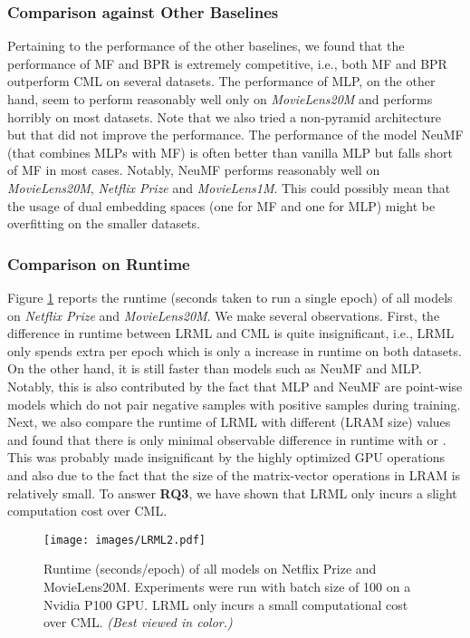 \documentclass[sigconf]{acmart}
\begin{document}
\subsubsection{Comparison against Other Baselines}
Pertaining to the performance of the other baselines, we found that the performance of MF and BPR is extremely competitive, i.e., both MF and BPR outperform CML on several datasets. The performance of MLP, on the other hand, seem to perform reasonably well only on \textit{MovieLens20M} and performs horribly on most datasets. Note that we also tried a non-pyramid architecture but that did not improve the performance.  The performance of the model NeuMF (that combines MLPs with MF) is often better than vanilla MLP but falls short of MF in most cases. Notably, NeuMF performs reasonably well on \textit{MovieLens20M}, \textit{Netflix Prize} and \textit{MovieLens1M}. This could possibly mean that the usage of dual embedding spaces (one for MF and one for MLP) might be overfitting on the smaller datasets. 

\subsubsection{Comparison on Runtime}
Figure \ref{fig:runtime} reports the runtime (seconds taken to run a single epoch) of all models on \textit{Netflix Prize} and \textit{MovieLens20M}. We make several observations. First, the difference in runtime between \textsc{LRML} and CML is quite insignificant, i.e., \textsc{LRML} only spends  extra per epoch which is only a  increase in runtime on both datasets. On the other hand, it is still faster than models such as NeuMF and MLP. Notably, this is also contributed by the fact that MLP and NeuMF are point-wise models which do not pair negative samples with positive samples during training. Next, we also compare the runtime of \textsc{LRML} with different  (LRAM size) values and found that there is only minimal observable difference in runtime with  or . This was probably made insignificant by the highly optimized GPU operations and also due to the fact that the size of the matrix-vector operations in LRAM is relatively small. To answer \textbf{RQ3}, we have shown that \textsc{LRML} only incurs a slight computation cost over CML. 

\begin{figure}[ht]
\begin{center}
\texttt{[image: images/LRML2.pdf]}
\caption{Runtime (seconds/epoch) of all models on Netflix Prize and MovieLens20M. Experiments were run with batch size of 100 on a Nvidia P100 GPU. LRML only incurs a small computational cost over CML. \textit{(Best viewed in color.)}}
\label{fig:runtime}
\end{center}
\end{figure}
\end{document}
